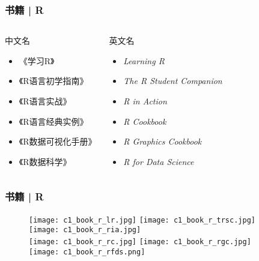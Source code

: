 \begin{frame}
  \frametitle{书籍 | R}
  \begin{columns}
  \begin{block}{中文名}
    \begin{itemize}
      \item \alert{《学习R》}
      \item 《R语言初学指南》
      \item 《R语言实战》
      \item \alert{《R语言经典实例》}
      \item \alert{《R数据可视化手册》}
      \item \alert{《R数据科学》}
    \end{itemize}
  \end{block}
  \begin{block}{英文名}
    \begin{itemize}
      \item \textit{Learning R}
      \item \textit{The R Student Companion}
      \item \textit{R in Action}
      \item \textit{R Cookbook}
      \item \textit{R Graphics Cookbook}
      \item \textit{R for Data Science}
    \end{itemize}
  \end{block}
\end{columns}
\end{frame}

\begin{frame}
  \frametitle{书籍 | R}
  \begin{figure}
    \centering
    \texttt{[image: c1\_book\_r\_lr.jpg]}\qquad
    \texttt{[image: c1\_book\_r\_trsc.jpg]}\qquad
    \texttt{[image: c1\_book\_r\_ria.jpg]}\\
    \texttt{[image: c1\_book\_r\_rc.jpg]}\qquad
    \texttt{[image: c1\_book\_r\_rgc.jpg]}\qquad
    \texttt{[image: c1\_book\_r\_rfds.png]}\\
  \end{figure}
\end{frame}

